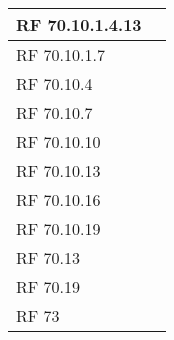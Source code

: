 {\begin{longtable} [c]{| p{2cm} | p{13cm} |}
 \hline 
RF 70.10.1.4.13 & \\ 
 \hline 
RF 70.10.1.7 & \\ 
 \hline 
RF 70.10.4 & \\ 
 \hline 
RF 70.10.7 & \\ 
 \hline 
RF 70.10.10 & \\ 
 \hline 
RF 70.10.13 & \\ 
 \hline 
RF 70.10.16 & \\ 
 \hline 
RF 70.10.19 & \\ 
 \hline 
RF 70.13 & \\ 
 \hline 
RF 70.19 & \\ 
 \hline 
RF 73 & \\ 
 \hline 
\end{longtable}}